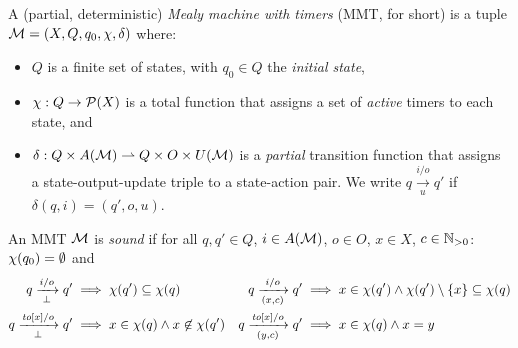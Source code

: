 \begin{definition}\label{def:MMT}
  A (partial, deterministic) \emph{Mealy machine with timers} (MMT, for short) is a tuple
  \(\mathcal{M} = (X, Q, q_0, {\chi}, \delta)\) where:
  \begin{itemize}
    \item
    \(Q\) is a finite set of states, with \(q_0 \in Q\) the \emph{initial state},
    \item
    \({\chi} : Q \to {\mathcal{P}}(X)\) is a total function that assigns a
    set of \emph{active} timers to each state,
    and
    \item
    \(\delta : Q \times {A({\mathcal{M}})} \rightharpoonup Q \times O \times {U({\mathcal{M}})}\)
    is a \emph{partial} transition function that assigns a state-output-update triple to a
    state-action pair.
    We write \(q \xrightarrow[u]{i/o} q'\) if \(\delta(q, i) = (q', o, u)\).
  \end{itemize}
  An MMT 
  \(\mathcal{M}\) is 
  \emph{sound} if for all \(q, q' \in Q\),
  \(i \in {A({\mathcal{M}})}\), \(o \in O\), \(x \in X\), \(c \in {\mathbb N}_{>0}\): ${\chi}(q_0) = \emptyset$ and
  \begin{align*}
  q \xrightarrow[\bot]{i/o} q' \implies{} &
    {\chi}(q') \subseteq {\chi}(q)
  &
  q \xrightarrow[(x, c)]{i/o} q' \implies{} &
    x \in {\chi}(q')
    \land {\chi}(q') \setminus \{x\} \subseteq {\chi}(q)
  \\
  q \xrightarrow[\bot]{\mathit{to}[x]/o} q' \implies{} &
    x \in {\chi}(q) \land x \not\in {\chi}(q')
  &
  q \xrightarrow[(y, c)]{\mathit{to}[x]/o} q' \implies {} &
    x \in {\chi}(q) \land x=y
  \end{align*}
\end{definition}
